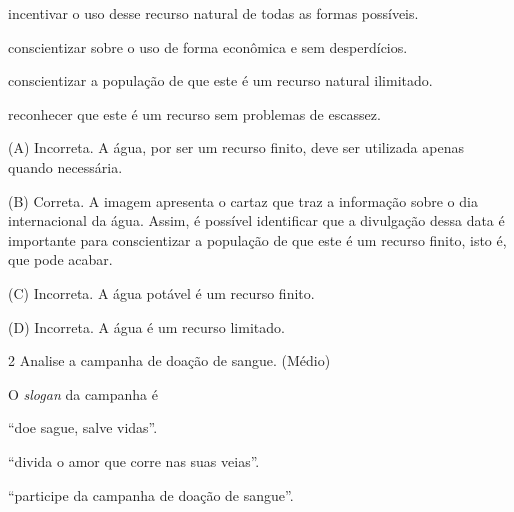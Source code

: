 \begin{escolha}
\begin{escolha}
\begin{escolha}
\item incentivar o uso desse recurso natural de todas as formas possíveis.

\item conscientizar sobre o uso de forma econômica e sem desperdícios.

\item conscientizar a população de que este é um recurso natural ilimitado.

\item reconhecer que este é um recurso sem problemas de escassez.
\end{escolha}



(A) Incorreta. A água, por ser um recurso finito, deve ser utilizada
apenas quando necessária.

(B) Correta. A imagem apresenta o cartaz que traz a informação sobre o
dia internacional da água. Assim, é possível identificar que a
divulgação dessa data é importante para conscientizar a população de que
este é um recurso finito, isto é, que pode acabar.

(C) Incorreta. A água potável é um recurso finito.

(D) Incorreta. A água é um recurso limitado.

\num{2} Analise a campanha de doação de sangue. (Médio)


O \emph{slogan} da campanha é

\begin{escolha}
\item ``doe sague, salve vidas''.

\item ``divida o amor que corre nas suas veias''.

\item ``participe da campanha de doação de sangue''.


\end{escolha}
\end{escolha}
\end{escolha}
